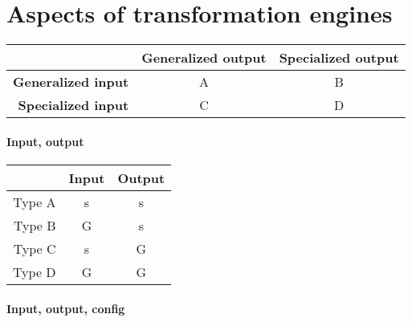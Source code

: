 \documentclass{article}
\begin{document}
\section{Aspects of transformation engines}

\begin{tabular}{r | c | c}
  & \textbf{Generalized output} & \textbf{Specialized output} \\ \hline

  \textbf{Generalized input} &
  A
  &
  B 

  \\ \hline

  \textbf{Specialized input} &
  C
  &
  D
\end{tabular}







\paragraph{Input, output}

\begin{tabular}{r | c | c }
  &
  \textbf{Input} &
  \textbf{Output}
  \\ \hline

  Type A &
  s &
  s \\ \hline

  Type B &
  G &
  s \\ \hline


  Type C &
  s &
  G \\ \hline

  Type D &
  G &
  G \\ \hline

\end{tabular}










\paragraph{Input, output, config}
\end{document}
